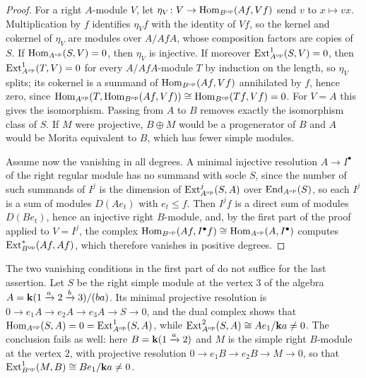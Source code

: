 \begin{proof}
  For a right $A$-module $V$, let ${\eta_V\colon V\to\Hom[B^{\op}]{Af}{Vf}}$ send
  $v$ to ${x\mapsto vx}$. Multiplication by $f$ identifies $\eta_Vf$ with the
  identity of $Vf$, so the kernel and cokernel of $\eta_V$ are modules over
  $A/AfA$, whose composition factors are copies of $S$. If
  ${\Hom[A^{\op}]{S}{V}=0}$, then $\eta_V$ is injective. If moreover
  ${\operatorname{Ext}^1_{A^{\mathrm{op}}}(S,V)=0}$, then
  ${\operatorname{Ext}^1_{A^{\mathrm{op}}}(T,V)=0}$ for every $A/AfA$-module $T$ by
  induction on the length, so $\eta_V$ splits; its cokernel is a summand of
  $\Hom[B^{\op}]{Af}{Vf}$ annihilated by $f$, hence zero, since
  ${\Hom[A^{\op}]{T}{\Hom[B^{\op}]{Af}{Vf}}\cong\Hom[B^{\op}]{Tf}{Vf}=0}$. For
  ${V=A}$ this gives the isomorphism. Passing from $A$ to $B$ removes exactly the
  isomorphism class of $S$. If $M$ were projective, ${B\oplus M}$ would be a
  progenerator of $B$ and $A$ would be Morita equivalent to $B$, which has fewer
  simple modules.

  Assume now the vanishing in all degrees. A minimal injective resolution
  ${A\to I^\bullet}$ of the right regular module has no summand with socle $S$,
  since the number of such summands of $I^j$ is the dimension of
  ${\operatorname{Ext}^j_{A^{\mathrm{op}}}(S,A)}$ over ${\operatorname{End}_{A^{\mathrm{op}}}(S)}$,
  so each $I^j$ is a sum of modules $D(Ae_t)$ with ${e_t\leq f}$. Then
  $I^jf$ is a direct sum of modules $D(Be_t)$, hence an injective right
  $B$-module, and, by the first part of the proof applied to ${V=I^j}$, the
  complex
  ${\Hom[B^{\op}]{Af}{I^\bullet f}\cong\Hom[A^{\op}]{A}{I^\bullet}}$ computes
  $\operatorname{Ext}^*_{B^{\mathrm{op}}}(Af,Af)$, which therefore vanishes in positive
  degrees.
\end{proof}

\begin{example}
  The two vanishing conditions in the first part of
   do not suffice for the last assertion. Let $S$ be
  the right simple module at the vertex $3$ of the algebra
  ${A}={\mathbf{k}(1\xrightarrow{a}2\xrightarrow{b}3)/(ba)}$. Its minimal projective resolution is
  ${0\to e_1A\to e_2A\to e_3A\to S\to0}$, and the dual complex shows that
  ${\Hom[A^{\op}]{S}{A}}={0}={\operatorname{Ext}^1_{A^{\op}}(S,A)}$, while
  ${\operatorname{Ext}^2_{A^{\mathrm{op}}}(S,A)}\cong{ Ae_1/\mathbf{k}a}\neq{0}$. The
  conclusion fails as well: here ${B=\mathbf{k}(1\xrightarrow{a}2)}$ and $M$ is the simple
  right $B$-module at the vertex $2$, with projective resolution
  ${0\to e_1B\to e_2B\to M\to0}$, so that
  ${\operatorname{Ext}^1_{B^{\mathrm{op}}}(M,B)\cong Be_1/\mathbf{k} a\neq0}$.
\end{example}

